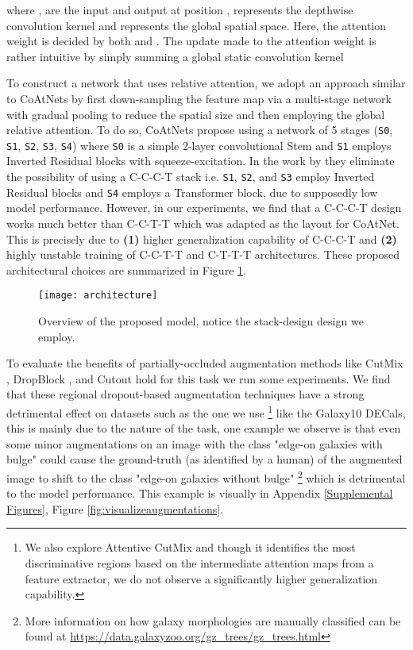 \documentclass{article} \usepackage{iclr2023_conference,times}
\begin{document}
where ,  are the input and output at position ,  represents the depthwise convolution kernel and  represents the global spatial space. Here, the attention weight  is decided by both  and . The update made to the attention weight is rather intuitive by simply summing a global static convolution kernel



To construct a network that uses relative attention, we adopt an approach similar to CoAtNets by first down-sampling the feature map via a multi-stage network with gradual pooling to reduce the spatial size and then employing the global relative attention. To do so, CoAtNets propose using a network of 5 stages (\texttt{S0}, \texttt{S1}, \texttt{S2}, \texttt{S3}, \texttt{S4}) where \texttt{S0} is a simple 2-layer convolutional Stem and \texttt{S1} employs Inverted Residual blocks \citep{sandler2018mobilenetv2} with squeeze-excitation. In the work by \cite{dai2021coatnet} they eliminate the possibility of using a C-C-C-T stack i.e. \texttt{S1}, \texttt{S2}, and \texttt{S3} employ Inverted Residual blocks \citep{sandler2018mobilenetv2} and \texttt{S4} employs a Transformer block, due to supposedly low model performance. However, in our experiments, we find that a C-C-C-T design works much better than C-C-T-T which was adapted as the layout for CoAtNet. This is precisely due to \textbf{(1)} higher generalization capability of C-C-C-T and \textbf{(2)} highly unstable training of C-C-T-T and C-T-T-T architectures. These proposed architectural choices are summarized in Figure \ref{fig:architecture}.

\begin{figure}[t]
    \centering
    \texttt{[image: architecture]}
    \caption{Overview of the proposed model, notice the stack-design design we employ.}
    \label{fig:architecture}
\end{figure}

To evaluate the benefits of partially-occluded augmentation methods like CutMix \citep{yun2019cutmix}, DropBlock \citep{ghiasi2018dropblock}, and Cutout \citep{https://doi.org/10.48550/arxiv.1708.04552} hold for this task we run some experiments. We find that these regional dropout-based augmentation techniques have a strong detrimental effect on datasets such as the one we use \footnote{We also explore Attentive CutMix \citep{https://doi.org/10.48550/arxiv.2003.13048} and though it identifies the most discriminative regions based on the intermediate attention maps from a feature extractor, we do not observe a significantly higher generalization capability.} like the Galaxy10 DECals, this is mainly due to the nature of the task, one example we observe is that even some minor augmentations on an image with the class "edge-on galaxies with bulge" could cause the ground-truth (as identified by a human) of the augmented image to shift to the class "edge-on galaxies without bulge" \footnote{More information on how galaxy morphologies are manually classified can be found at \url{https://data.galaxyzoo.org/gz_trees/gz_trees.html}} which is detrimental to the model performance. This example is visually in Appendix \ref{Supplemental Figures}, Figure \ref{fig:visualizeaugmentations}.
\end{document}
